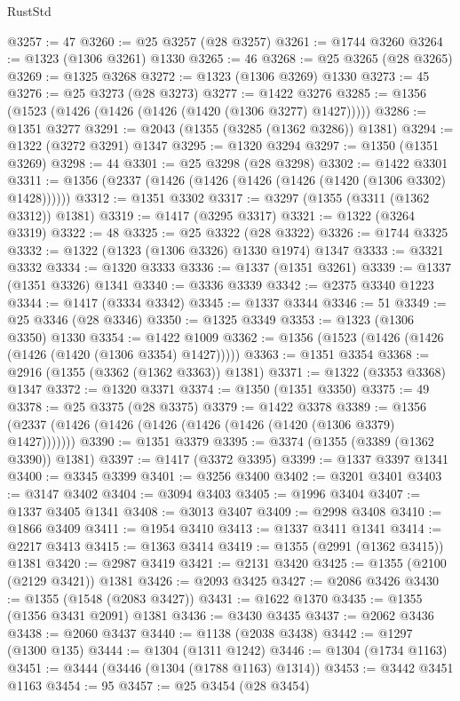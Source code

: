 \begin{lexlean}{RustStd}
\begin{coremodule}
@3257 := 47
@3260 := @25 @3257 (@28 @3257)
@3261 := @1744 @3260
@3264 := @1323 (@1306 @3261) @1330
@3265 := 46
@3268 := @25 @3265 (@28 @3265)
@3269 := @1325 @3268
@3272 := @1323 (@1306 @3269) @1330
@3273 := 45
@3276 := @25 @3273 (@28 @3273)
@3277 := @1422 @3276
@3285 := @1356 (@1523 (@1426 (@1426 (@1426 (@1420 (@1306 @3277) @1427)))))
@3286 := @1351 @3277
@3291 := @2043 (@1355 (@3285 (@1362 @3286)) @1381)
@3294 := @1322 (@3272 @3291) @1347
@3295 := @1320 @3294
@3297 := @1350 (@1351 @3269)
@3298 := 44
@3301 := @25 @3298 (@28 @3298)
@3302 := @1422 @3301
@3311 := @1356 (@2337 (@1426 (@1426 (@1426 (@1426 (@1420 (@1306 @3302) @1428))))))
@3312 := @1351 @3302
@3317 := @3297 (@1355 (@3311 (@1362 @3312)) @1381)
@3319 := @1417 (@3295 @3317)
@3321 := @1322 (@3264 @3319)
@3322 := 48
@3325 := @25 @3322 (@28 @3322)
@3326 := @1744 @3325
@3332 := @1322 (@1323 (@1306 @3326) @1330 @1974) @1347
@3333 := @3321 @3332
@3334 := @1320 @3333
@3336 := @1337 (@1351 @3261)
@3339 := @1337 (@1351 @3326) @1341
@3340 := @3336 @3339
@3342 := @2375 @3340 @1223
@3344 := @1417 (@3334 @3342)
@3345 := @1337 @3344
@3346 := 51
@3349 := @25 @3346 (@28 @3346)
@3350 := @1325 @3349
@3353 := @1323 (@1306 @3350) @1330
@3354 := @1422 @1009
@3362 := @1356 (@1523 (@1426 (@1426 (@1426 (@1420 (@1306 @3354) @1427)))))
@3363 := @1351 @3354
@3368 := @2916 (@1355 (@3362 (@1362 @3363)) @1381)
@3371 := @1322 (@3353 @3368) @1347
@3372 := @1320 @3371
@3374 := @1350 (@1351 @3350)
@3375 := 49
@3378 := @25 @3375 (@28 @3375)
@3379 := @1422 @3378
@3389 := @1356 (@2337 (@1426 (@1426 (@1426 (@1426 (@1426 (@1420 (@1306 @3379) @1427)))))))
@3390 := @1351 @3379
@3395 := @3374 (@1355 (@3389 (@1362 @3390)) @1381)
@3397 := @1417 (@3372 @3395)
@3399 := @1337 @3397 @1341
@3400 := @3345 @3399
@3401 := @3256 @3400
@3402 := @3201 @3401
@3403 := @3147 @3402
@3404 := @3094 @3403
@3405 := @1996 @3404
@3407 := @1337 @3405 @1341
@3408 := @3013 @3407
@3409 := @2998 @3408
@3410 := @1866 @3409
@3411 := @1954 @3410
@3413 := @1337 @3411 @1341
@3414 := @2217 @3413
@3415 := @1363 @3414
@3419 := @1355 (@2991 (@1362 @3415)) @1381
@3420 := @2987 @3419
@3421 := @2131 @3420
@3425 := @1355 (@2100 (@2129 @3421)) @1381
@3426 := @2093 @3425
@3427 := @2086 @3426
@3430 := @1355 (@1548 (@2083 @3427))
@3431 := @1622 @1370
@3435 := @1355 (@1356 @3431 @2091) @1381
@3436 := @3430 @3435
@3437 := @2062 @3436
@3438 := @2060 @3437
@3440 := @1138 (@2038 @3438)
@3442 := @1297 (@1300 @135)
@3444 := @1304 (@1311 @1242)
@3446 := @1304 (@1734 @1163)
@3451 := @3444 (@3446 (@1304 (@1788 @1163) @1314))
@3453 := @3442 @3451 @1163
@3454 := 95
@3457 := @25 @3454 (@28 @3454)

\end{coremodule}
\end{lexlean}
